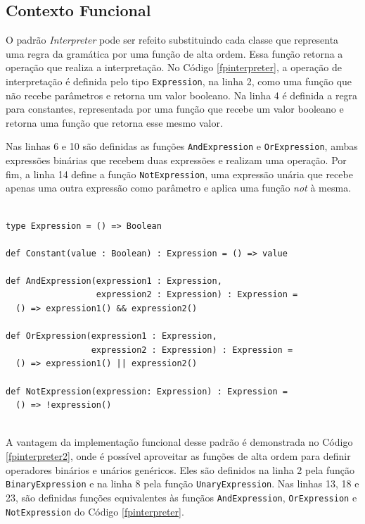 \subsection*{Contexto Funcional}

O padrão \textit{Interpreter} pode ser refeito substituindo 
cada classe que representa uma regra da gramática 
por uma função de alta ordem. Essa função retorna a 
operação que realiza a interpretação. No Código 
\ref{fpinterpreter}, a operação de interpretação 
é definida pelo tipo \texttt{Expression}, na linha 2, como 
uma função que não recebe parâmetros e retorna um 
valor booleano. Na linha 4 é definida a regra para 
constantes, representada por uma função que recebe 
um valor booleano e retorna uma função que retorna 
esse mesmo valor.

Nas linhas 6 e 10 são definidas as funções 
\texttt{AndExpression} e \texttt{OrExpression}, ambas expressões 
binárias que recebem duas expressões e realizam 
uma operação. Por fim, a linha 14 define a função 
\texttt{NotExpression}, uma expressão unária que recebe 
apenas uma outra expressão como parâmetro e 
aplica uma função \textit{not} à mesma.

\begin{lstlisting}[caption={\textit{Interpreter} Funcional.},label=fpinterpreter]
    
type Expression = () => Boolean

def Constant(value : Boolean) : Expression = () => value
  
def AndExpression(expression1 : Expression,
                  expression2 : Expression) : Expression =
  () => expression1() && expression2()
  
def OrExpression(expression1 : Expression,
                 expression2 : Expression) : Expression =
  () => expression1() || expression2()
  
def NotExpression(expression: Expression) : Expression =
  () => !expression()
    
\end{lstlisting}

A vantagem da implementação funcional desse 
padrão é demonstrada no Código \ref{fpinterpreter2}, 
onde é possível aproveitar as funções de alta 
ordem para definir operadores binários e unários 
genéricos. Eles são definidos na linha 2 pela função 
\texttt{BinaryExpression} e na linha 8 pela função 
\texttt{UnaryExpression}. Nas linhas 13, 18 e 23, são 
definidas funções equivalentes às funçãos 
\texttt{AndExpression}, \texttt{OrExpression} e \texttt{NotExpression} do 
Código \ref{fpinterpreter}.

